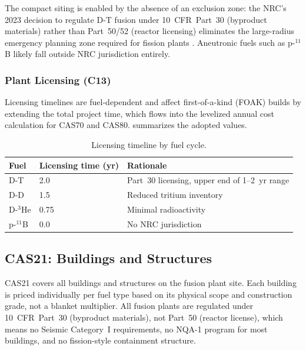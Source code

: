 \documentclass{article}
\begin{document}
The compact siting is enabled by the absence of an exclusion zone:
the NRC's 2023 decision to regulate D-T fusion under 10~CFR~Part~30
(byproduct materials) rather than Part~50/52 (reactor licensing)
eliminates the large-radius emergency planning zone required for
fission plants \citep{nrc2023}. Aneutronic fuels such as p-${}^{11}$B
likely fall outside NRC jurisdiction entirely.

\subsubsection{Plant Licensing (C13)}
Licensing timelines are fuel-dependent and affect first-of-a-kind
(FOAK) builds by extending the total project time, which flows into
the levelized annual cost calculation for CAS70 and CAS80.
 summarizes the adopted values.

\begin{table}[htbp]
\caption{Licensing timeline by fuel cycle.}
\label{tab:licensing}
\centering
\begin{tabular}{lll}
\toprule
Fuel & Licensing time (yr) & Rationale \\
\midrule
D-T   & 2.0 & Part~30 licensing, upper end of 1--2~yr range \\
D-D   & 1.5 & Reduced tritium inventory \\
D-${}^3$He & 0.75 & Minimal radioactivity \\
p-${}^{11}$B & 0.0 & No NRC jurisdiction \\
\bottomrule
\end{tabular}
\end{table}


\subsection{CAS21: Buildings and Structures}
\label{sec:cas21}

CAS21 covers all buildings and structures on the fusion plant site.
Each building is priced individually per fuel type based on its
physical scope and construction grade, not a blanket multiplier.
All fusion plants are regulated under 10~CFR~Part~30 (byproduct
materials), not Part~50 (reactor license), which means no Seismic
Category~I requirements, no NQA-1 program for most buildings, and
no fission-style containment structure.
\end{document}
